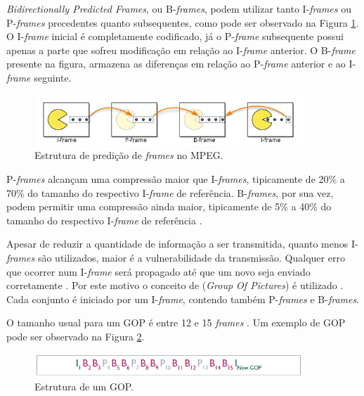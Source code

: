 \emph{Bidirectionally Predicted Frames}, ou B-\emph{frames}, podem utilizar tanto I-\emph{frames} ou P-\emph{frames} precedentes quanto subsequentes, como pode ser observado na Figura \ref{fig:ipbframes}. O I-\emph{frame} inicial é completamente codificado, já o P-\emph{frame} subsequente possui apenas a parte que sofreu modificação em relação ao I-\emph{frame} anterior. O B-\emph{frame} presente na figura, armazena as diferenças em relação ao P-\emph{frame} anterior e ao I-\emph{frame} seguinte.

\begin{figure}[!htb]
	\centering
	\includegraphics[width=0.9\textwidth]{./imgs/ipbframes.png}
	\caption{Estrutura de predição de \emph{frames} no MPEG.}
	\label{fig:ipbframes}
\end{figure}

P-\emph{frames} alcançam uma compressão maior que I-\emph{frames}, tipicamente de 20\% a 70\% do tamanho do respectivo I-\emph{frame} de referência. B-\emph{frames}, por sua vez, podem permitir uma compressão ainda maior, tipicamente de 5\% a 40\% do tamanho do respectivo I-\emph{frame} de referência \cite{ciscoieee}.

Apesar de reduzir a quantidade de informação a ser transmitida, quanto menos I-\emph{frames} são utilizados, maior é a vulnerabilidade da transmissão. Qualquer erro que ocorrer num I-\emph{frame} será propagado até que um novo seja enviado corretamente  \cite{mpeg2ref}. Por este motivo o conceito de  (\emph{Group Of Pictures}) é utilizado \cite{mpeg2ref}. Cada conjunto é iniciado por um I-\emph{frame}, contendo também P-\emph{frames} e B-\emph{frames}.

O tamanho usual para um GOP é entre 12 e 15 \emph{frames} \cite{ciscoieee, mpeg2ref}. Um exemplo de GOP pode ser observado na Figura \ref{fig:gop}.

\begin{figure}[!htb]
	\centering
	\includegraphics[width=0.9\textwidth]{./imgs/gop.png}
	\caption{Estrutura de um GOP.}
	\label{fig:gop}
\end{figure}

